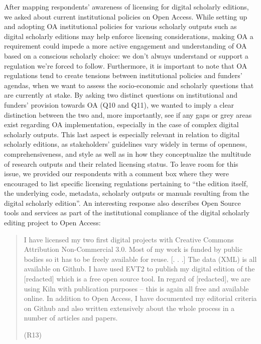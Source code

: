 \begin{paper}
After mapping respondents' awareness of licensing for digital scholarly
editions, we asked about current institutional policies on Open Access.
While setting up and adopting OA institutional policies for various
scholarly outputs such as digital scholarly editions may help enforce
licensing considerations, making OA a requirement could impede a more
active engagement and understanding of OA based on a conscious scholarly
choice: we don't always understand or support a regulation we're forced
to follow. Furthermore, it is important to note that OA regulations tend
to create tensions between institutional policies and funders' agendas,
when we want to assess the socio-economic and scholarly questions that
are currently at stake. By asking two distinct questions on
institutional and funders' provision towards OA (Q10 and Q11), we wanted
to imply a clear distinction between the two and, more importantly, see
if any gaps or grey areas exist regarding OA implementation, especially
in the case of complex digital scholarly outputs. This last aspect is
especially relevant in relation to digital scholarly editions, as
stakeholders' guidelines vary widely in terms of openness,
comprehensiveness, and style as well as in how they conceptualize the
multitude of research outputs and their related licensing status. To
leave room for this issue, we provided our respondents with a comment
box where they were encouraged to list specific licensing regulations
pertaining to ``the edition itself, the underlying code, metadata,
scholarly outputs or manuals resulting from the digital scholarly
edition''. An interesting response also describes Open Source tools and
services as part of the institutional compliance of the digital
scholarly editing project to Open Access:

\begin{quote}
I have licensed my two first digital projects with Creative Commons
Attribution Non-Commercial 3.0. Most of my work is funded by public
bodies so it has to be freely available for reuse. {[}. . .{]} The data
(XML) is all available on Github. I have used EVT2 to publish my digital
edition of the {[}redacted{]} which is a free open source tool. In
regard of {[}redacted{]}, we are using Kiln with publication purposes --
this is again all free and available online. In addition to Open Access,
I have documented my editorial criteria on Github and also written
extensively about the whole process in a number of articles and papers.
\begin{flushright}
(R13)
\end{flushright}
\end{quote}


\end{paper}
